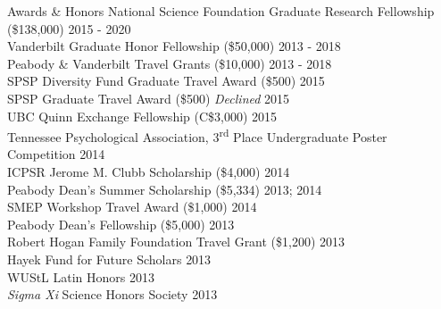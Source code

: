 \documentclass {resume}
\begin{document}
\begin{rSection}{\textrm{Awards \& Honors}}
National Science Foundation Graduate Research Fellowship (\$138,000) \hfill{2015 - 2020}\smallskip\\
Vanderbilt Graduate Honor Fellowship (\$50,000)	\hfill  {2013 - 2018}\smallskip\\	
Peabody \& Vanderbilt Travel Grants (\$10,000)      \hfill  {2013 - 2018}\smallskip\\
SPSP Diversity Fund Graduate Travel Award (\$500) \hfill{2015}\smallskip\\
SPSP Graduate Travel Award (\$500) {\small \textit{Declined}} \hfill{2015}\smallskip\\
UBC Quinn Exchange Fellowship (C\$3,000) \hfill{2015}\smallskip\\
Tennessee Psychological Association, 3\textsuperscript{rd} Place Undergraduate Poster Competition \hfill{2014}\smallskip\\
ICPSR Jerome M. Clubb Scholarship (\$4,000) \hfill{2014}\smallskip\\
Peabody Dean's Summer Scholarship (\$5,334)			    \hfill  {2013; 2014}\smallskip\\	
SMEP Workshop Travel Award (\$1,000) \hfill{2014}\smallskip\\
Peabody Dean's Fellowship (\$5,000)					\hfill  {2013}\smallskip\\
Robert Hogan Family Foundation Travel Grant (\$1,200) 	\hfill  {2013}\smallskip\\
Hayek Fund for Future Scholars                      \hfill  {2013}\smallskip\\
WUStL Latin Honors \hfill  {2013}\smallskip\\
\textit{Sigma Xi} Science Honors Society                    			\hfill  {2013}%
\end{rSection}

\end{document}
